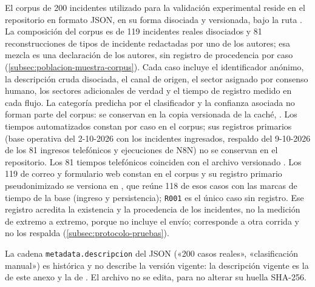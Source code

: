 El corpus de 200 incidentes utilizado para la validación experimental reside en el repositorio en formato JSON, en su forma disociada y versionada, bajo la ruta . La composición del corpus es de 119 incidentes reales disociados y 81 reconstrucciones de tipos de incidente redactadas por uno de los autores; esa mezcla es una declaración de los autores, sin registro de procedencia por caso (\autoref{subsec:poblacion-muestra-corpus}). Cada caso incluye el identificador anónimo, la descripción cruda disociada, el canal de origen, el sector asignado por consenso humano, los sectores adicionales de verdad y el tiempo de registro medido en cada flujo. La categoría predicha por el clasificador y la confianza asociada no forman parte del corpus: se conservan en la copia versionada de la caché, . Los tiempos automatizados constan por caso en el corpus; sus registros primarios (base operativa del 2-10-2026 con los incidentes ingresados, respaldo del 9-10-2026 de los 81 ingresos telefónicos y ejecuciones de N8N) no se conservan en el repositorio. Los 81 tiempos telefónicos coinciden con el archivo versionado . Los 119 de correo y formulario web constan en el corpus y su registro primario pseudonimizado se versiona en , que reúne 118 de esos casos con las marcas de tiempo de la base (ingreso y persistencia); \texttt{R001} es el único caso sin registro. Ese registro acredita la existencia y la procedencia de los incidentes, no la medición de extremo a extremo, porque no incluye el envío;  corresponde a otra corrida y no los respalda (\autoref{subsec:protocolo-pruebas}).

La cadena \texttt{metadata.descripcion} del JSON («200 casos reales», «clasificación manual») es histórica y no describe la versión vigente: la descripción vigente es la de este anexo y la de . El archivo no se edita, para no alterar su huella SHA-256.

